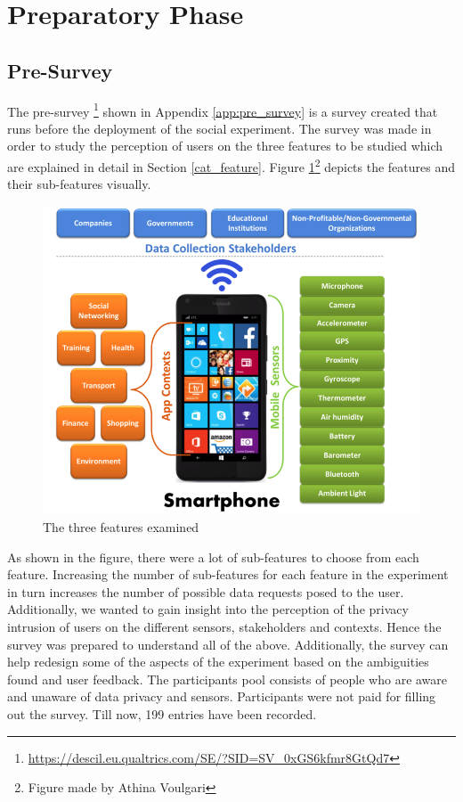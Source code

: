 \section{Preparatory Phase} \label{prep}

\subsection{Pre-Survey}

The pre-survey \footnote{\url{https://descil.eu.qualtrics.com/SE/?SID=SV_0xGS6kfmr8GtQd7}} shown in Appendix \ref{app:pre_survey} is a survey created that runs before the deployment of the social experiment.
The survey was made in order to study the perception of users on the three features to be studied which are explained in detail in Section \ref{cat_feature}. Figure \ref{fig:all_features}\footnote{Figure made by Athina Voulgari} depicts the features and their sub-features visually.

\begin{figure}[ht!]
\centering
\includegraphics[width=\textwidth,keepaspectratio]{./images/all_features}
\caption{The three features examined}
\label{fig:all_features}
\end{figure}

As shown in the figure, there were a lot of sub-features to choose from each feature.
Increasing the number of sub-features for each feature in the experiment in turn increases the number of possible data requests posed to the user. Additionally,
we wanted to gain insight into the perception of the privacy intrusion of users on the different sensors, stakeholders and contexts. Hence the survey
was prepared to understand all of the above. Additionally, the survey can help redesign some of the aspects of the experiment based on the
ambiguities found and user feedback. The participants pool consists of people who are aware and unaware of data privacy and sensors. Participants were not paid for filling out the survey. Till now, 199 entries have been recorded.

